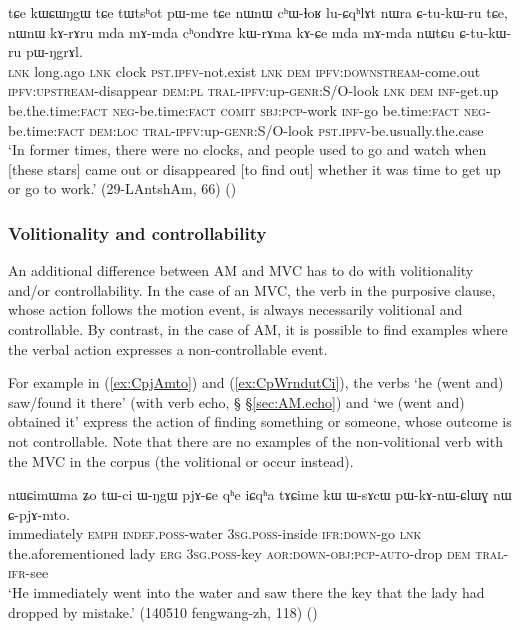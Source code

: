  \begin{exe}
\ex \label{ex:kWrAma.kACe}
\gll  tɕe kɯɕɯŋgɯ tɕe tɯtsʰot pɯ-me tɕe  nɯnɯ cʰɯ-ɬoʁ lu-ɕqʰlɤt nɯra ɕ-tu-kɯ-ru tɕe, nɯnɯ kɤ-rɤru mda mɤ-mda cʰondɤre kɯ-rɤma kɤ-ɕe mda mɤ-mda nɯtɕu ɕ-tu-kɯ-ru pɯ-ŋgrɤl. \\
 \textsc{lnk} long.ago \textsc{lnk} clock \textsc{pst}.\textsc{ipfv}-not.exist \textsc{lnk} \textsc{dem} \textsc{ipfv}:\textsc{downstream}-come.out \textsc{ipfv}:\textsc{upstream}-disappear \textsc{dem}:\textsc{pl} \textsc{tral}-\textsc{ipfv}:up-\textsc{genr}:S/O-look \textsc{lnk} \textsc{dem} \textsc{inf}-get.up be.the.time:\textsc{fact} \textsc{neg}-be.time:\textsc{fact} \textsc{comit} \textsc{sbj}:\textsc{pcp}-work \textsc{inf}-go be.time:\textsc{fact} \textsc{neg}-be.time:\textsc{fact} \textsc{dem}:\textsc{loc} \textsc{tral}-\textsc{ipfv}:up-\textsc{genr}:S/O-look \textsc{pst}.\textsc{ipfv}-be.usually.the.case  \\
 \glt  `In former times, there were no clocks, and people used to go and watch when [these stars] came out or disappeared [to find out] whether it was time to get up or go to work.' (29-LAntshAm, 66) ()
  \end{exe}
  
\subsubsection{Volitionality and controllability} \label{sec:AM.volitionality}
An additional difference between AM and MVC has to do with volitionality and/or controllability. In the case of an MVC, the verb in the purposive clause, whose action follows the motion event, is always necessarily volitional and controllable. By contrast, in the case of AM, it is possible to find examples where the verbal action expresses a non-controllable event.

For example in (\ref{ex:CpjAmto}) and (\ref{ex:CpWrndutCi}), the verbs  `he (went and) saw/found it there'  (with verb echo, § §\ref{sec:AM.echo})  and  `we (went and) obtained it' express the action of finding something or someone, whose outcome is not controllable. Note that there are no examples of the non-volitional verb  with the MVC in the corpus (the volitional  or  occur instead). 


\begin{exe}
\ex  \label{ex:CpjAmto}
\gll  nɯɕimɯma ʑo tɯ-ci ɯ-ŋgɯ pjɤ-ɕe qʰe iɕqʰa tɤɕime kɯ ɯ-sɤcɯ pɯ-kɤ-nɯ-ɕlɯɣ nɯ ɕ-pjɤ-mto. \\
immediately \textsc{emph} \textsc{indef}.\textsc{poss}-water \textsc{3sg}.\textsc{poss}-inside \textsc{ifr}:\textsc{down}-go \textsc{lnk} the.aforementioned lady \textsc{erg} \textsc{3sg}.\textsc{poss}-key \textsc{aor}:\textsc{down}-\textsc{obj}:\textsc{pcp}-\textsc{auto}-drop \textsc{dem} \textsc{tral}-\textsc{ifr}-see \\
\glt `He immediately went into the water and saw there the key that the lady had dropped by mistake.' (140510 fengwang-zh, 118)
()
\end{exe}

